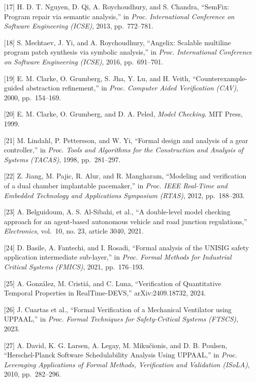 \documentclass[
]{article}
\begin{document}
{[}17{]} H. D. T. Nguyen, D. Qi, A. Roychoudhury, and S. Chandra,
``SemFix: Program repair via semantic analysis,'' in \emph{Proc.
International Conference on Software Engineering (ICSE)}, 2013,
pp.~772--781.

{[}18{]} S. Mechtaev, J. Yi, and A. Roychoudhury, ``Angelix: Scalable
multiline program patch synthesis via symbolic analysis,'' in
\emph{Proc. International Conference on Software Engineering (ICSE)},
2016, pp.~691--701.

{[}19{]} E. M. Clarke, O. Grumberg, S. Jha, Y. Lu, and H. Veith,
``Counterexample-guided abstraction refinement,'' in \emph{Proc.
Computer Aided Verification (CAV)}, 2000, pp.~154--169.

{[}20{]} E. M. Clarke, O. Grumberg, and D. A. Peled, \emph{Model
Checking}. MIT Press, 1999.

{[}21{]} M. Lindahl, P. Pettersson, and W. Yi, ``Formal design and
analysis of a gear controller,'' in \emph{Proc. Tools and Algorithms for
the Construction and Analysis of Systems (TACAS)}, 1998, pp.~281--297.

{[}22{]} Z. Jiang, M. Pajic, R. Alur, and R. Mangharam, ``Modeling and
verification of a dual chamber implantable pacemaker,'' in \emph{Proc.
IEEE Real-Time and Embedded Technology and Applications Symposium
(RTAS)}, 2012, pp.~188--203.

{[}23{]} A. Belguidoum, A. S. Al-Sibahi, et al., ``A double-level model
checking approach for an agent-based autonomous vehicle and road
junction regulations,'' \emph{Electronics}, vol.~10, no. 23, article
3040, 2021.

{[}24{]} D. Basile, A. Fantechi, and I. Rosadi, ``Formal analysis of the
UNISIG safety application intermediate sub-layer,'' in \emph{Proc.
Formal Methods for Industrial Critical Systems (FMICS)}, 2021,
pp.~176--193.

{[}25{]} A. González, M. Cristiá, and C. Luna, ``Verification of
Quantitative Temporal Properties in RealTime-DEVS,'' arXiv:2409.18732,
2024.

{[}26{]} J. Cuartas et al., ``Formal Verification of a Mechanical
Ventilator using UPPAAL,'' in \emph{Proc. Formal Techniques for
Safety-Critical Systems (FTSCS)}, 2023.

{[}27{]} A. David, K. G. Larsen, A. Legay, M. Mikučionis, and D. B.
Poulsen, ``Herschel-Planck Software Schedulability Analysis Using
UPPAAL,'' in \emph{Proc. Leveraging Applications of Formal Methods,
Verification and Validation (ISoLA)}, 2010, pp.~282--296.
\end{document}

